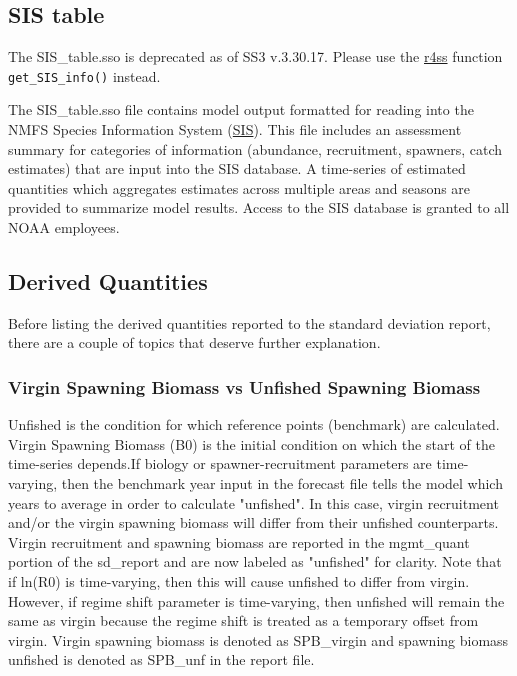 \subsection{SIS table}
The SIS\_table.sso is deprecated as of SS3 v.3.30.17. Please use the \hyperref[sec:r4ss]{r4ss} function \texttt{get\_SIS\_info()} instead. 

The SIS\_table.sso file contains model output formatted for reading into the NMFS Species Information System (\href{https://www.st.nmfs.noaa.gov/sis/}{SIS}). This file includes an assessment summary for categories of information (abundance, recruitment, spawners, catch estimates) that are input into the SIS database. A time-series of estimated quantities which aggregates estimates across multiple areas and seasons are provided to summarize model results. Access to the SIS database is granted to all NOAA employees.

\subsection{Derived Quantities}
Before listing the derived quantities reported to the standard deviation report, there are a couple of topics that deserve further explanation.

\hypertarget{VirginUnfished}{}
\subsubsection{Virgin Spawning Biomass vs Unfished Spawning Biomass}
Unfished is the condition for which reference points (benchmark) are calculated.  Virgin Spawning Biomass (B0) is the initial condition on which the start of the time-series depends.If biology or spawner-recruitment parameters are time-varying, then the benchmark year input in the forecast file tells the model which years to average in order to calculate "unfished". In this case, virgin recruitment and/or the virgin spawning biomass will differ from their unfished counterparts. Virgin recruitment and spawning biomass are reported in the mgmt\_quant portion of the sd\_report and are now labeled as "unfished" for clarity.  Note that if ln(R0) is time-varying, then this will cause unfished to differ from virgin. However, if regime shift parameter is time-varying, then unfished will remain the same as virgin because the regime shift is treated as a temporary offset from virgin. Virgin spawning biomass is denoted as SPB\_virgin and spawning biomass unfished is denoted as SPB\_unf in the report file.

